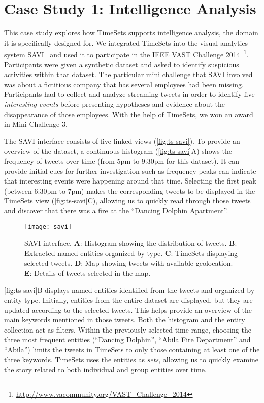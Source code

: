 \section{Case Study 1: Intelligence Analysis}
\label{sub:ts-vast}
This case study explores how TimeSets supports intelligence analysis, the domain it is specifically designed for. We integrated TimeSets into the visual analytics system SAVI~\cite{Xu2014} and used it to participate in the IEEE VAST Challenge 2014~\footnote{\url{http://www.vacommunity.org/VAST+Challenge+2014}}. Participants were given a synthetic dataset and asked to identify suspicious activities within that dataset. The particular mini challenge that SAVI involved was about a fictitious company that has several employees had been missing. Participants had to collect and analyze streaming tweets in order to identify five \emph{interesting events} before presenting hypotheses and evidence about the disappearance of those employees. With the help of TimeSets, we won an award in Mini Challenge 3.

The SAVI interface consists of five linked views (\autoref{fig:ts-savi}). To provide an overview of the dataset, a continuous histogram (\autoref{fig:ts-savi}A) shows the frequency of tweets over time (from 5pm to 9:30pm for this dataset). It can provide initial cues for further investigation such as frequency peaks can indicate that interesting events were happening around that time. Selecting the first peak (between 6:30pm to 7pm) makes the corresponding tweets to be displayed in the TimeSets view (\autoref{fig:ts-savi}C), allowing us to quickly read through those tweets and discover that there was a fire at the ``Dancing Dolphin Apartment''. 

\begin{figure}[!htb]
	\centering
	\texttt{[image: savi]}
	\caption{SAVI interface. \textbf{A}: Histogram showing the distribution of tweets. \textbf{B}: Extracted named entities organized by type. \textbf{C}: TimeSets displaying selected tweets. \textbf{D}: Map showing tweets with available geolocation. \textbf{E}: Details of tweets selected in the map.}
	\label{fig:ts-savi}
\end{figure}

\autoref{fig:ts-savi}B displays named entities identified from the tweets and organized by entity type. Initially, entities from the entire dataset are displayed, but they are updated according to the selected tweets. This helps provide an overview of the main keywords mentioned in those tweets. Both the histogram and the entity collection act as filters. Within the previously selected time range, choosing the three most frequent entities (``Dancing Dolphin'', ``Abila Fire Department'' and ``Abila'') limits the tweets in TimeSets to only those containing at least one of the three keywords. TimeSets uses the entities as \emph{sets}, allowing us to quickly examine the story related to both individual and group entities over time.

